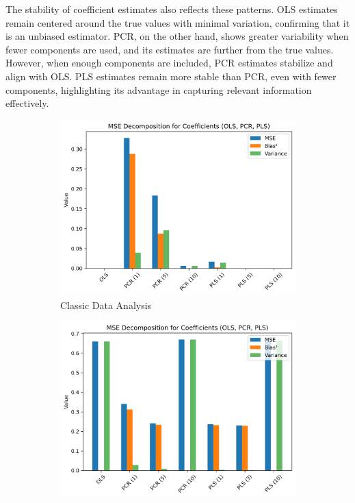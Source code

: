 \documentclass[11pt,twoside,a4paper]{article}
\begin{document}
The stability of coefficient estimates also reflects these patterns. OLS estimates remain centered around the true values with minimal variation, confirming that it is an unbiased estimator. PCR, on the other hand, shows greater variability when fewer components are used, and its estimates are further from the true values. However, when enough components are included, PCR estimates stabilize and align with OLS. PLS estimates remain more stable than PCR, even with fewer components, highlighting its advantage in capturing relevant information effectively.

\begin{figure}[H]
    \centering
    \begin{subfigure}{0.32\textwidth}
        \centering
        \includegraphics[width=\linewidth]{Fifth_plot.png}
        \caption{Classic Data Analysis}
        \label{fig:Classic_data_analysis}
    \end{subfigure}
    \hfill
    \begin{subfigure}{0.32\textwidth}
        \centering
        \includegraphics[width=\linewidth]{Fifth_plot_second_simulation.png}

\end{subfigure}
\end{figure}
\end{document}
